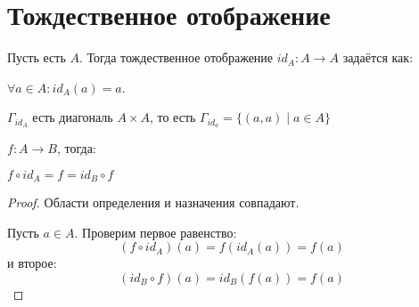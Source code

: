 ﻿\section{Тождественное отображение}

\begin{Def} Пусть есть $A$. Тогда тождественное отображение $id_{A}: A \to A$ задаётся как:

$\forall a \in A\colon id_A(a) = a$.

$\Gamma_{id_A}$ есть диагональ $A \times A$, то есть $\Gamma_{id_a} = \{(a, a) \mid a \in A\}$
\end{Def}

\begin{theorem}{}
$f: A \to B$, тогда:

$f \circ id_A = f =  id_B \circ f$
\end{theorem}

\begin{proof}

Области определения и назначения совпадают.

Пусть $a \in A$. Проверим первое равенство:
\[(f \circ id_A)(a) = f(id_A(a)) = f(a)\]
и второе:
\[(id_B \circ f)(a) = id_B(f(a)) = f(a)\]

\end{proof}